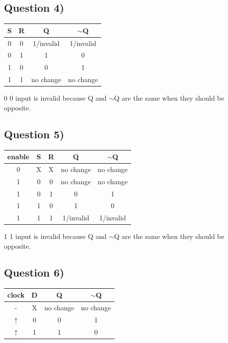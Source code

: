 \documentclass[pdftex,12pt,a4paper]{article}
\begin{document}
\subsection{Question 4)}
\begin{table}[H]
\begin{tabular}{|c|c|c|c|}
\hline
S & R & Q & $\sim$Q         \\ \hline
0 & 0 & 1/invalid & 1/invalid    \\ \hline
0 & 1 & 1 & 0                 \\ \hline
1 & 0 & 0 & 1                 \\ \hline
1 & 1 & no change & no change  \\ \hline
\end{tabular}
\end{table}
0 0 input is invalid because Q and $\sim$Q are the same when they should be opposite.
\subsection{Question 5)}
\begin{table}[H]
\begin{tabular}{|c|c|c|c|c|}
\hline
enable & S & R & Q & $\sim$Q         \\ \hline
0 & X & X & no change & no change    \\ \hline
1 & 0 & 0 & no change & no change  \\ \hline
1 & 0 & 1 & 0 & 1                 \\ \hline
1 & 1 & 0 & 1 & 0                 \\ \hline
1 & 1 & 1 & 1/invalid & 1/invalid  \\ \hline
\end{tabular}
\end{table}
1 1 input is invalid because Q and $\sim$Q are the same when they should be opposite.

\subsection{Question 6)}

\begin{table}[H]
\begin{tabular}{|c|c|c|c|}
\hline
clock & D & Q & $\sim$Q         \\ \hline
- & X & no change & no change    \\ \hline
$\uparrow$ & 0 & 0 & 1                 \\ \hline
$\uparrow$ & 1 & 1 & 0                 \\ \hline
\end{tabular}
\end{table}
\end{document}
